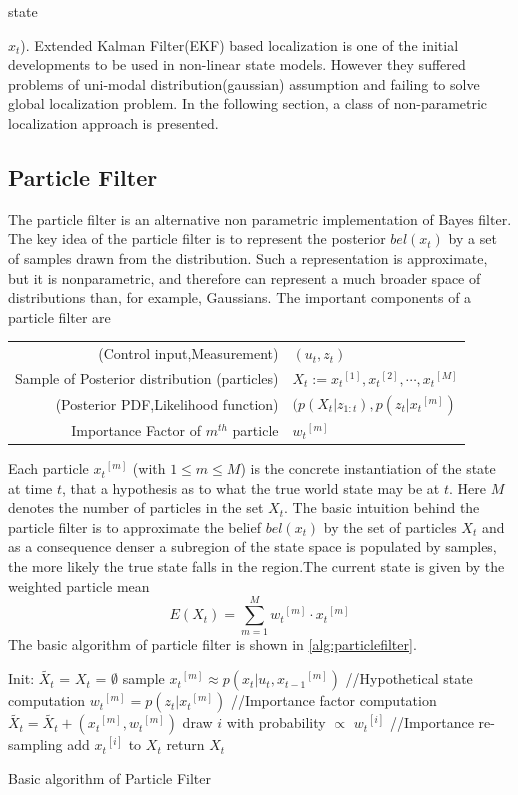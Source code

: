 state {$x_t$). Extended Kalman Filter(EKF) based localization is one of the initial developments to be used in non-linear state models. However they suffered problems of uni-modal distribution(gaussian) assumption and failing to solve global localization problem. In the following section, a class of non-parametric localization approach is presented. 
\subsection{Particle Filter}
\label{ssec:particlefilter}
	The particle filter\cite{thrun2005probabilistic} is an alternative non parametric implementation of Bayes filter. The key idea of the particle filter is to represent the posterior $bel(x_t)$ by a set of samples drawn from the distribution. Such a representation is approximate, but it is nonparametric, and therefore can represent a much broader space of distributions than, for example, Gaussians. The important components of a particle filter are\\
\begin{tabular}{r l}
\centering
  (Control input,Measurement) & $(u_t,z_t)$ \\ 
  Sample of Posterior distribution (particles) & $X_t := {x_t}^{[1]},{x_t}^{[2]},\cdots,{x_t}^{[M]}$ \\
  (Posterior PDF,Likelihood function) & $(p(X_t\vert z_{1:t}),p(z_t \vert {x_t}^{[m]})$ \\
  Importance Factor of $m^{th}$ particle & ${w_t}^{[m]}$ \\
\end{tabular}
	
	Each particle ${x_t}^{[m]}$ (with $1 \leq m \leq M$) is the concrete instantiation of the state at time $t$, that a hypothesis as to what the true world state may be at $t$. Here $M$ denotes the number of particles in the set $X_t$. The basic intuition behind the particle filter is to approximate the belief $bel(x_t)$ by the set of particles $X_t$ and as a consequence denser a subregion of the state space is populated by samples, the more likely the true state falls in the region.The current state is given by the weighted particle mean 
\begin{equation}
E(X_t) = \sum_{m=1}^{M} {w_t}^{[m]}\cdot {x_t}^{[m]}
\end{equation}
The basic algorithm of particle filter is shown in \ref{alg:particlefilter}.\\ 
\begin{algorithm}
Init: {$\tilde{X_t}$ = $X_t$ = $\emptyset$ } \;
  { 
   sample ${x_t}^{[m]} \approx p(x_t \vert u_t,{x_{t-1}}^{[m]}) $ //Hypothetical state computation \;
   ${w_t}^{[m]} = p(z_t \vert {x_t}^{[m]} )$ //Importance factor computation\;
   $\tilde{X_t} = \tilde{X_t} + ({x_t}^{[m]},{w_t}^{[m]})$ \;
 }
  { 
   draw $i$ with probability $\varpropto$ ${w_t}^{[i]}$ //Importance re-sampling\;
   add ${x_t}^{[i]}$ to $X_t$ \;
 }
 return $X_t$
 \caption{Basic algorithm of Particle Filter}
 \label{alg:particlefilter}
\end{algorithm}
}
